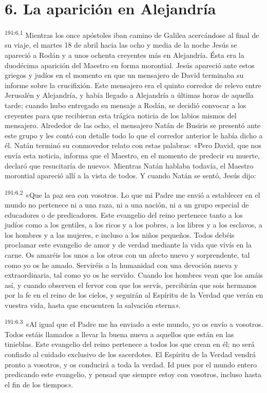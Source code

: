 \section*{6. La aparición en Alejandría}
\par 
\textsuperscript{191:6.1} Mientras los once apóstoles iban camino de Galilea acercándose al final de su viaje, el martes 18 de abril hacia las ocho y media de la noche Jesús se apareció a Rodán y a unos ochenta creyentes más en Alejandría. Ésta era la duodécima aparición del Maestro en forma morontial. Jesús apareció ante estos griegos y judíos en el momento en que un mensajero de David terminaba su informe sobre la crucifixión. Este mensajero era el quinto corredor de relevo entre Jerusalén y Alejandría, y había llegado a Alejandría a últimas horas de aquella tarde; cuando hubo entregado su mensaje a Rodán, se decidió convocar a los creyentes para que recibieran esta trágica noticia de los labios mismos del mensajero. Alrededor de las ocho, el mensajero Natán de Busiris se presentó ante este grupo y les contó con detalle todo lo que el corredor anterior le había dicho a él. Natán terminó su conmovedor relato con estas palabras: «Pero David, que nos envía esta noticia, informa que el Maestro, en el momento de predecir su muerte, declaró que resucitaría de nuevo». Mientras Natán hablaba todavía, el Maestro morontial apareció allí a la vista de todos. Y cuando Natán se sentó, Jesús dijo:

\par 
\textsuperscript{191:6.2} «Que la paz sea con vosotros. Lo que mi Padre me envió a establecer en el mundo no pertenece ni a una raza, ni a una nación, ni a un grupo especial de educadores o de predicadores. Este evangelio del reino pertenece tanto a los judíos como a los gentiles, a los ricos y a los pobres, a los libres y a los esclavos, a los hombres y a las mujeres, e incluso a los niños pequeños. Todos debéis proclamar este evangelio de amor y de verdad mediante la vida que vivís en la carne. Os amaréis los unos a los otros con un afecto nuevo y sorprendente, tal como yo os he amado. Serviréis a la humanidad con una devoción nueva y extraordinaria, tal como yo os he servido. Cuando los hombres vean que los amáis así, y cuando observen el fervor con que los servís, percibirán que sois hermanos por la fe en el reino de los cielos, y seguirán al Espíritu de la Verdad que verán en vuestra vida, hasta que encuentren la salvación eterna».

\par 
\textsuperscript{191:6.3} «Al igual que el Padre me ha enviado a este mundo, yo os envío a vosotros. Todos estáis llamados a llevar la buena nueva a aquellos que están en las tinieblas. Este evangelio del reino pertenece a todos los que crean en él; no será confiado al cuidado exclusivo de los sacerdotes. El Espíritu de la Verdad vendrá pronto a vosotros, y os conducirá a toda la verdad. Id pues por el mundo entero predicando este evangelio, y pensad que siempre estoy con vosotros, incluso hasta el fin de los tiempos».


